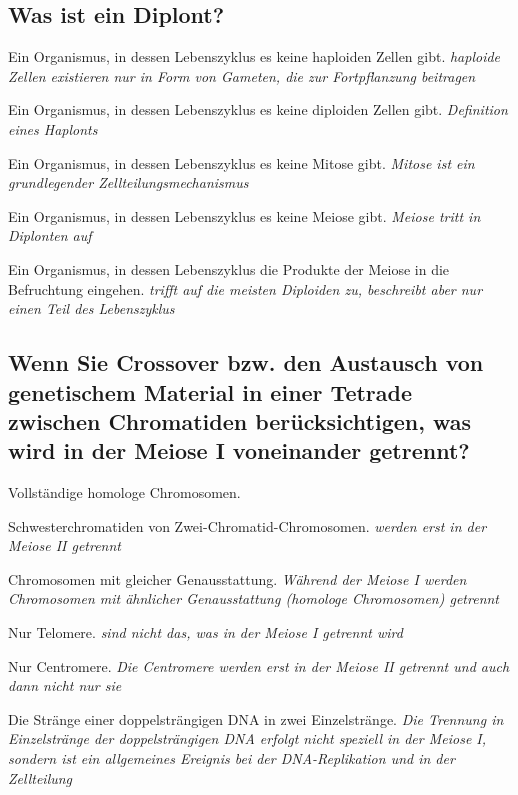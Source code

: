 \documentclass{article}
\newcommand{\cmark}{\ding{51}}%
\newcommand{\done}{\rlap{$\square$}{\raisebox{2pt}{\large\hspace{1pt}\cmark}}%
\hspace{-2.5pt}}
\newcommand{\maybe}{\rlap{($\square$)}{(\raisebox{2pt}{\large\hspace{1pt}\cmark}}%
\hspace{-2.5pt}}
\begin{document}
\subsection*{Was ist ein Diplont?}
\begin{todolist}%
\item[\done] Ein Organismus, in dessen Lebenszyklus es keine haploiden Zellen
gibt. \textit{\scriptsize haploide Zellen existieren nur in Form von Gameten, die zur Fortpflanzung beitragen}
\item Ein Organismus, in dessen Lebenszyklus es keine diploiden Zellen
gibt. \textit{\scriptsize Definition eines Haplonts}
\item Ein Organismus, in dessen Lebenszyklus es keine Mitose gibt. \textit{\scriptsize Mitose ist ein grundlegender Zellteilungsmechanismus}
\item Ein Organismus, in dessen Lebenszyklus es keine Meiose gibt. \textit{\scriptsize Meiose tritt in Diplonten auf}
\item[\maybe] Ein Organismus, in dessen Lebenszyklus die Produkte der Meiose in
die Befruchtung eingehen. \textit{\scriptsize trifft auf die meisten Diploiden zu, beschreibt aber nur einen Teil des Lebenszyklus }
\end{todolist}

\subsection*{Wenn Sie Crossover bzw. den Austausch von genetischem Material in
einer Tetrade zwischen Chromatiden berücksichtigen, was wird in der
Meiose I voneinander getrennt?}
\begin{todolist} %
\item[\done] Vollständige homologe Chromosomen.
\item Schwesterchromatiden von Zwei-Chromatid-Chromosomen. \textit{\scriptsize werden erst in der Meiose II getrennt}
\item Chromosomen mit gleicher Genausstattung. \textit{\scriptsize Während der Meiose I werden Chromosomen mit ähnlicher Genausstattung (homologe Chromosomen) getrennt}
\item Nur Telomere. \textit{\scriptsize  sind nicht das, was in der Meiose I getrennt wird}
\item Nur Centromere. \textit{\scriptsize Die Centromere werden erst in der Meiose II getrennt und auch dann nicht nur sie}
\item Die Stränge einer doppelsträngigen DNA in zwei Einzelstränge. \textit{\scriptsize  Die Trennung in Einzelstränge der doppelsträngigen DNA erfolgt nicht speziell in der Meiose I, sondern ist ein allgemeines Ereignis bei der DNA-Replikation und in der Zellteilung}
\end{todolist}
\end{document}
